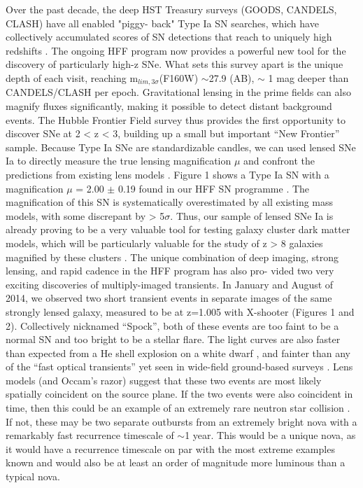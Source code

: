 Over the past decade, the deep HST Treasury surveys (GOODS, CANDELS, CLASH) have all enabled "piggy- back" Type Ia SN searches, which have collectively accumulated scores of SN detections that reach to uniquely high redshifts \citep{Riess2007, Rodney2014b, Graur2014}.  
The ongoing HFF program now provides a powerful new tool for the discovery of particularly high-z SNe. What sets this survey apart is the unique depth of each visit, reaching m$_{lim,3\sigma}$(F160W) $\sim$27.9 (AB), $\sim$ 1 mag deeper than CANDELS/CLASH per epoch. Gravitational lensing in the prime fields can also magnify fluxes significantly, making it possible to detect distant background events. 
The Hubble Frontier Field survey thus provides the first opportunity to discover SNe at 2 < z < 3, building up a small but important “New Frontier” sample.
Because Type Ia SNe are standardizable candles, we can used lensed SNe Ia to directly measure the true lensing magnification $\mu$ and confront the predictions from existing lens models \citep[e.g.][]{Riehm2011, Li2012, Patel2014}. Figure 1 shows a Type Ia SN with a magnification $\mu$ = 2.00 $\pm$ 0.19 found in our HFF SN programme \citep{Rodney2015}. The magnification of this SN is systematically overestimated by all existing mass models, with some discrepant by > 5$\sigma$. Thus, our sample of lensed SNe Ia is already proving to be a very valuable tool for testing galaxy cluster dark matter models, which will be particularly valuable for the study of z > 8 galaxies magnified by these clusters \citep[e.g.][]{Zheng2012}.
The unique combination of deep imaging, strong lensing, and rapid cadence in the HFF program has also pro- vided two very exciting discoveries of multiply-imaged transients. In January and August of 2014, we observed two short transient events in separate images of the same strongly lensed galaxy, measured to be at z=1.005 with X-shooter (Figures 1 and 2). Collectively nicknamed “Spock”, both of these events are too faint to be a normal SN and too bright to be a stellar flare. The light curves are also faster than expected from a He shell explosion on a white dwarf \citep[a “.Ia” event][]{Bildsten2007}, and fainter than any of the “fast optical transients” yet seen in wide-field ground-based surveys \citep[e.g.][]{Kasliwal2010, Poznanski2010a, Vinko2014}.
Lens models (and Occam’s razor) suggest that these two events are most likely spatially coincident on the source plane. If the two events were also coincident in time, then this could be an example of an extremely rare neutron star collision \citep[a “kilonova”][]{Tanvir2013, Barnes2013}. If not, these may be two separate outbursts from an extremely bright nova with a remarkably fast recurrence timescale of $\sim$1 year. This would be a unique nova, as it would have a recurrence timescale on par with the most extreme examples known \citep{Tang2014} and would also be at least an order of magnitude more luminous than a typical nova.
